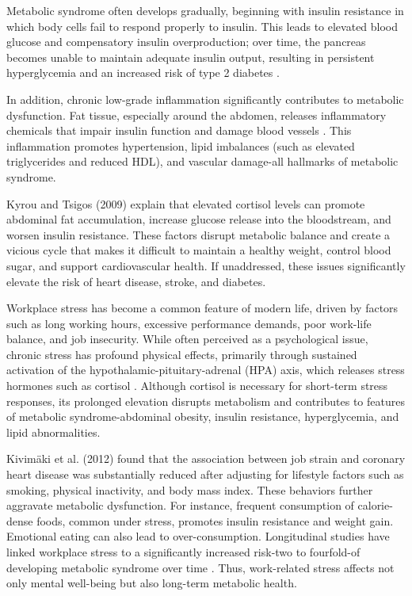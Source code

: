 \par Metabolic syndrome often develops gradually, beginning with insulin resistance in which body cells fail to respond properly to insulin. This leads to elevated blood glucose and compensatory insulin overproduction; over time, the pancreas becomes unable to maintain adequate insulin output, resulting in persistent hyperglycemia and an increased risk of type 2 diabetes \citep{mayoclinic_metsyn,clevelandclinic_metsyn,cdc_insulinresistance}.

\par In addition, chronic low-grade inflammation significantly contributes to metabolic dysfunction. Fat tissue, especially around the abdomen, releases inflammatory chemicals that impair insulin function and damage blood vessels \citep{hotamisligil2006inflammation}. This inflammation promotes hypertension, lipid imbalances (such as elevated triglycerides and reduced HDL), and vascular damage-all hallmarks of metabolic syndrome.

\par Kyrou and Tsigos (2009) explain that elevated cortisol levels can promote abdominal fat accumulation, increase glucose release into the bloodstream, and worsen insulin resistance. These factors disrupt metabolic balance and create a vicious cycle that makes it difficult to maintain a healthy weight, control blood sugar, and support cardiovascular health. If unaddressed, these issues significantly elevate the risk of heart disease, stroke, and diabetes.

\par Workplace stress has become a common feature of modern life, driven by factors such as long working hours, excessive performance demands, poor work-life balance, and job insecurity. While often perceived as a psychological issue, chronic stress has profound physical effects, primarily through sustained activation of the hypothalamic-pituitary-adrenal (HPA) axis, which releases stress hormones such as cortisol \citep{chandola2006chronic}. Although cortisol is necessary for short-term stress responses, its prolonged elevation disrupts metabolism and contributes to features of metabolic syndrome-abdominal obesity, insulin resistance, hyperglycemia, and lipid abnormalities.

\par Kivimäki et al. (2012) found that the association between job strain and coronary heart disease was substantially reduced after adjusting for lifestyle factors such as smoking, physical inactivity, and body mass index. These behaviors further aggravate metabolic dysfunction. For instance, frequent consumption of calorie-dense foods, common under stress, promotes insulin resistance and weight gain. Emotional eating can also lead to over-consumption. Longitudinal studies have linked workplace stress to a significantly increased risk-two to fourfold-of developing metabolic syndrome over time \citep{chandola2006chronic}. Thus, work-related stress affects not only mental well-being but also long-term metabolic health.

